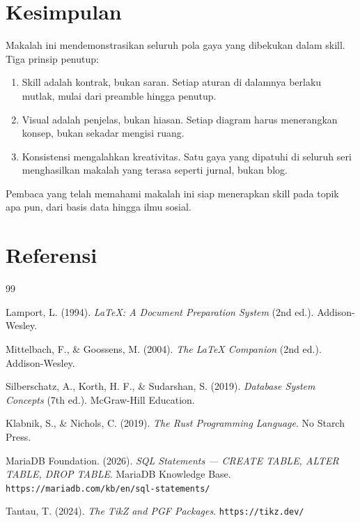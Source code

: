 \documentclass[11pt,a4paper]{article}
\begin{document}
\section{Kesimpulan}

Makalah ini mendemonstrasikan seluruh pola gaya yang dibekukan dalam skill. Tiga prinsip penutup:

\begin{enumerate}
	\item Skill adalah kontrak, bukan saran. Setiap aturan di dalamnya berlaku mutlak, mulai dari preamble hingga penutup.
	\item Visual adalah penjelas, bukan hiasan. Setiap diagram harus menerangkan konsep, bukan sekadar mengisi ruang.
	\item Konsistensi mengalahkan kreativitas. Satu gaya yang dipatuhi di seluruh seri menghasilkan makalah yang terasa seperti jurnal, bukan blog.
\end{enumerate}

Pembaca yang telah memahami makalah ini siap menerapkan skill pada topik apa pun, dari basis data hingga ilmu sosial.

\newpage
\section*{Referensi}

\begin{thebibliography}{99}

	Lamport, L. (1994).
	\textit{LaTeX: A Document Preparation System} (2nd ed.).
	Addison-Wesley.

	Mittelbach, F., \& Goossens, M. (2004).
	\textit{The LaTeX Companion} (2nd ed.).
	Addison-Wesley.

	Silberschatz, A., Korth, H. F., \& Sudarshan, S. (2019).
	\textit{Database System Concepts} (7th ed.).
	McGraw-Hill Education.

	Klabnik, S., \& Nichols, C. (2019).
	\textit{The Rust Programming Language}.
	No Starch Press.

	MariaDB Foundation. (2026).
	\textit{SQL Statements --- CREATE TABLE, ALTER TABLE,
		DROP TABLE}.
	MariaDB Knowledge Base.
	\texttt{https://mariadb.com/kb/en/sql-statements/}

	Tantau, T. (2024).
	\textit{The TikZ and PGF Packages}.
	\texttt{https://tikz.dev/}

\end{thebibliography}
\end{document}
